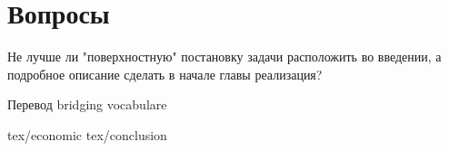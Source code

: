 \documentclass[12pt,a4paper,oneside]{extarticle}
\begin{document}
    \section{Вопросы}

    Не лучше ли "поверхностную" постановку задачи расположить во введении, а подробное описание сделать в начале главы реализация?

    Перевод bridging vocabulare

    \clearpage


    
     \clearpage
    \tableofcontents \clearpage
     \clearpage
     \clearpage
     \clearpage
     \clearpage
     \clearpage
     \clearpage
     {tex/economic} \clearpage
     {tex/conclusion} \clearpage
     \clearpage
\end{document}
